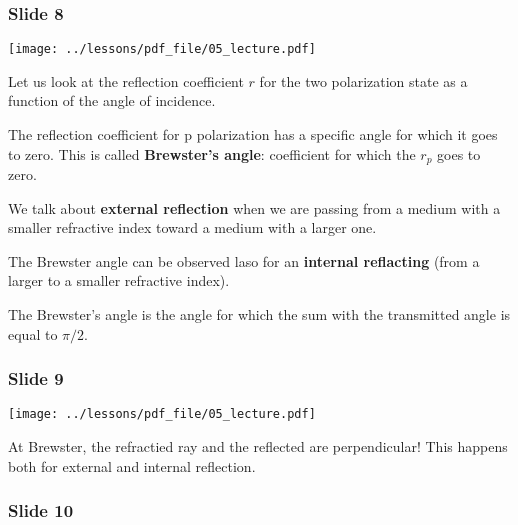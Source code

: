 \documentclass[../main/main.tex]{subfiles}
\begin{document}
\subsubsection*{Slide 8}

\begin{minipage}[]{0.5\linewidth}
\centering
\texttt{[image: ../lessons/pdf\_file/05\_lecture.pdf]}
\end{minipage}
\hspace{0.3cm}\vspace{0.3cm}
\begin{minipage}[c]{0.47\linewidth}

Let us look at the reflection coefficient \( r \) for the two polarization state as a function of the angle of incidence.

The reflection coefficient for p polarization has a specific angle for which it goes to zero. This is called \textbf{Brewster's angle}: coefficient for which the \( r_p \) goes to zero.

We talk about \textbf{external reflection} when we are passing from a medium with a smaller refractive index toward a medium with a larger one.

The Brewster angle can be observed laso for an \textbf{internal reflacting} (from a larger to a smaller refractive index).

The Brewster's angle is the angle for which the sum with the transmitted angle is equal to \( \pi /2 \).

\end{minipage}

\subsubsection*{Slide 9}

\begin{minipage}[]{0.5\linewidth}
\centering
\texttt{[image: ../lessons/pdf\_file/05\_lecture.pdf]}
\end{minipage}
\hspace{0.3cm}\vspace{0.3cm}
\begin{minipage}[c]{0.47\linewidth}

At Brewster, the refractied ray and the reflected are perpendicular! This happens both for external and internal reflection.

\end{minipage}

\subsubsection*{Slide 10}
\end{document}
